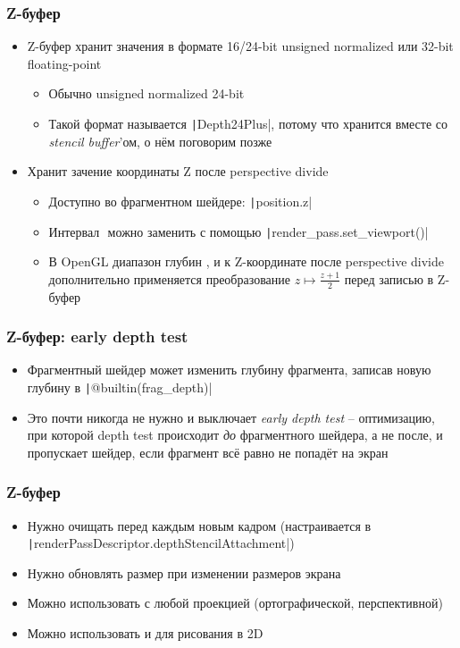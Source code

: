 \documentclass[10pt]{beamer}
\begin{document}
\begin{frame}[fragile]
\frametitle{Z-буфер}
\begin{itemize}
\item Z-буфер хранит значения в формате 16/24-bit unsigned normalized или 32-bit floating-point
\pause
\begin{itemize}
\item Обычно unsigned normalized 24-bit
\item Такой формат называется \texttt|Depth24Plus|, потому что хранится вместе со \textit{stencil buffer}'ом, о нём поговорим позже
\end{itemize}
\pause
\item Хранит зачение координаты Z после perspective divide
\pause
\begin{itemize}
\item Доступно во фрагментном шейдере: \texttt|position.z|
\pause
\item Интервал \begin{math}[0, 1]\end{math} можно заменить с помощью \texttt|render_pass.set_viewport()|
\pause
\item В OpenGL диапазон глубин \begin{math}[-1, 1]\end{math}, и к Z-координате после perspective divide дополнительно применяется преобразование \(z \mapsto \frac{z+1}{2}\) перед записью в Z-буфер
\end{itemize}
\end{itemize}
\end{frame}

\begin{frame}[fragile]
\frametitle{Z-буфер: early depth test}
\begin{itemize}
\item Фрагментный шейдер может изменить глубину фрагмента, записав новую глубину в \texttt|@builtin(frag_depth)|
\pause
\item Это почти никогда не нужно и выключает \textit{early depth test} -- оптимизацию, при которой depth test происходит \textit{до} фрагментного шейдера, а не после, и пропускает шейдер, если фрагмент всё равно не попадёт на экран
\end{itemize}
\end{frame}

\begin{frame}[fragile]
\frametitle{Z-буфер}
\begin{itemize}
\item Нужно очищать перед каждым новым кадром (настраивается в \texttt|renderPassDescriptor.depthStencilAttachment|)
\pause
\item Нужно обновлять размер при изменении размеров экрана
\pause
\item Можно использовать с любой проекцией (ортографической, перспективной)
\pause
\item Можно использовать и для рисования в 2D
\end{itemize}
\end{frame}
\end{document}

